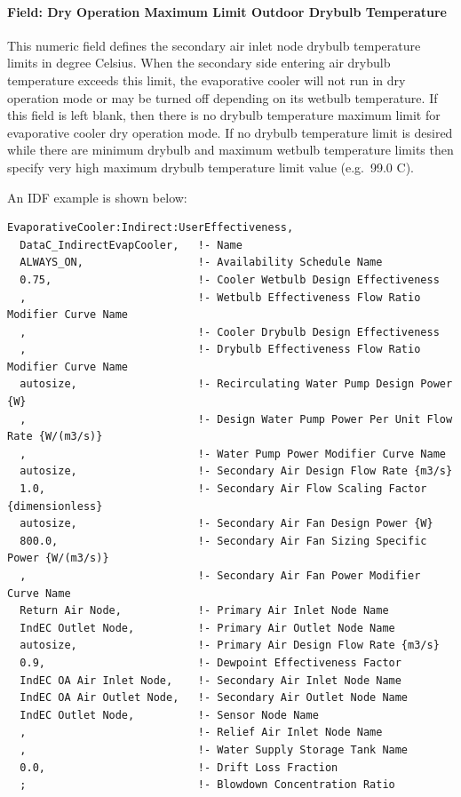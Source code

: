 \paragraph{Field: Dry Operation Maximum Limit Outdoor Drybulb Temperature}\label{field-evaporative-operation-maximum-limit-drybulb-temperature-1}

This numeric field defines the secondary air inlet node drybulb temperature limits in degree Celsius. When the secondary side entering air drybulb temperature exceeds this limit, the evaporative cooler will not run in dry operation mode or may be turned off depending on its wetbulb temperature. If this field is left blank, then there is no drybulb temperature maximum limit for evaporative cooler dry operation mode. If no drybulb temperature limit is desired while there are minimum drybulb and maximum wetbulb temperature limits then specify very high maximum drybulb temperature limit value (e.g.~99.0 C).

An IDF example is shown below:

\begin{lstlisting}
EvaporativeCooler:Indirect:UserEffectiveness,
  DataC_IndirectEvapCooler,   !- Name
  ALWAYS_ON,                  !- Availability Schedule Name
  0.75,                       !- Cooler Wetbulb Design Effectiveness
  ,                           !- Wetbulb Effectiveness Flow Ratio Modifier Curve Name
  ,                           !- Cooler Drybulb Design Effectiveness
  ,                           !- Drybulb Effectiveness Flow Ratio Modifier Curve Name
  autosize,                   !- Recirculating Water Pump Design Power {W}
  ,                           !- Design Water Pump Power Per Unit Flow Rate {W/(m3/s)}
  ,                           !- Water Pump Power Modifier Curve Name
  autosize,                   !- Secondary Air Design Flow Rate {m3/s}
  1.0,                        !- Secondary Air Flow Scaling Factor {dimensionless}
  autosize,                   !- Secondary Air Fan Design Power {W}
  800.0,                      !- Secondary Air Fan Sizing Specific Power {W/(m3/s)}
  ,                           !- Secondary Air Fan Power Modifier Curve Name
  Return Air Node,            !- Primary Air Inlet Node Name
  IndEC Outlet Node,          !- Primary Air Outlet Node Name
  autosize,                   !- Primary Air Design Flow Rate {m3/s}
  0.9,                        !- Dewpoint Effectiveness Factor
  IndEC OA Air Inlet Node,    !- Secondary Air Inlet Node Name
  IndEC OA Air Outlet Node,   !- Secondary Air Outlet Node Name
  IndEC Outlet Node,          !- Sensor Node Name
  ,                           !- Relief Air Inlet Node Name
  ,                           !- Water Supply Storage Tank Name
  0.0,                        !- Drift Loss Fraction
  ;                           !- Blowdown Concentration Ratio
\end{lstlisting}

